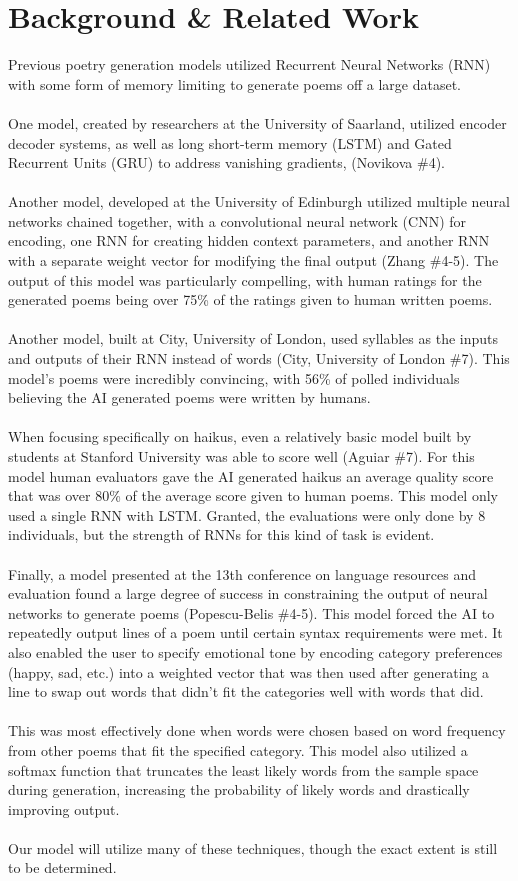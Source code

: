 \documentclass{article} %
\begin{document}
\section{Background \& Related Work}
Previous poetry generation models utilized Recurrent Neural Networks (RNN) with some form of memory limiting to generate poems off a large dataset.\\\\
One model, created by researchers at the University of Saarland, utilized encoder decoder systems, as well as long short-term memory (LSTM) and Gated Recurrent Units (GRU) to address vanishing gradients, (Novikova \#4).\\\\
Another model, developed at the University of Edinburgh utilized multiple neural networks chained together, with a convolutional neural network (CNN) for encoding, one RNN for creating hidden context parameters,
and another RNN with a separate weight vector for modifying the final output (Zhang \#4-5).
The output of this model was particularly compelling, with human ratings for the generated poems being over 75\% of the ratings given to human written poems.\\\\
Another model, built at City, University of London, used syllables as the inputs and outputs of their RNN instead of words (City, University of London \#7).
This model’s poems were incredibly convincing, with 56\% of polled individuals believing the AI generated poems were written by humans.\\\\
When focusing specifically on haikus, even a relatively basic model built by students at Stanford University was able to score well (Aguiar \#7). 
For this model human evaluators gave the AI generated haikus an average quality score that was over 80\% of the average score given to human poems. This model only used a single RNN with LSTM. 
Granted, the evaluations were only done by 8 individuals, but the strength of RNNs for this kind of task is evident.\\\\
Finally, a model presented at the 13th conference on language resources and evaluation found a large degree of success in constraining the output of neural networks to generate poems (Popescu-Belis \#4-5).
This model forced the AI to repeatedly output lines of a poem until certain syntax requirements were met. 
It also enabled the user to specify emotional tone by encoding category preferences (happy, sad, etc.) into a weighted vector that was then used after generating a line to swap out words that didn’t fit the categories well with words that did.\\\\
This was most effectively done when words were chosen based on word frequency from other poems that fit the specified category. 
This model also utilized a softmax function that truncates the least likely words from the sample space during generation, increasing the probability of likely words and drastically improving output.\\\\
Our model will utilize many of these techniques, though the exact extent is still to be determined.
\end{document}
